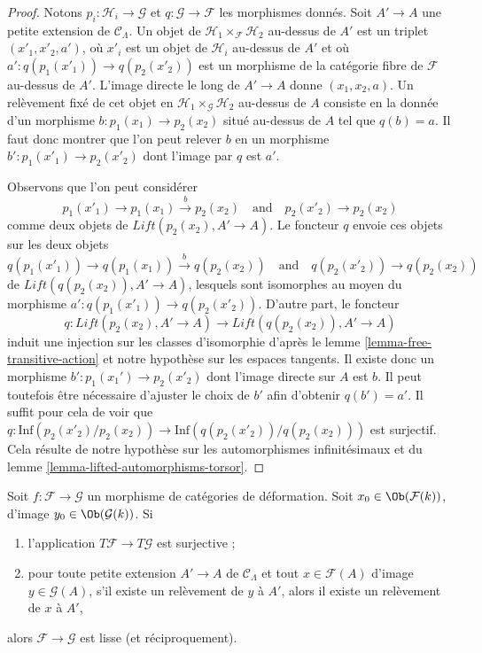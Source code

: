 \begin{proof}
Notons $p_i : \mathcal{H}_i \to \mathcal{G}$ et
$q : \mathcal{G} \to \mathcal{F}$ les morphismes donnés. Soit $A' \to A$ une
petite extension de $\mathcal{C}_\Lambda$. Un objet de
$\mathcal{H}_1 \times_\mathcal{F} \mathcal{H}_2$ au-dessus de $A'$ est un
triplet $(x'_1, x'_2, a')$, où $x'_i$ est un objet de $\mathcal{H}_i$
au-dessus de $A'$ et où $a' : q(p_1(x'_1)) \to q(p_2(x'_2))$ est un morphisme
de la catégorie fibre de $\mathcal{F}$ au-dessus de $A'$. L'image directe le
long de $A' \to A$ donne $(x_1, x_2, a)$. Un relèvement fixé de cet objet en
$\mathcal{H}_1 \times_\mathcal{G} \mathcal{H}_2$ au-dessus de $A$
consiste en la donnée d'un morphisme $b : p_1(x_1) \to p_2(x_2)$ situé au-dessus de $A$ tel que
$q(b) = a$. Il faut donc montrer que l'on peut relever $b$ en un morphisme
$b' : p_1(x'_1) \to p_2(x'_2)$ dont l'image par $q$ est $a'$.

\medskip\noindent
Observons que l'on peut considérer
$$
p_1(x'_1) \to p_1(x_1) \xrightarrow{b} p_2(x_2)
\quad\text{and}\quad
p_2(x'_2) \to p_2(x_2)
$$
comme deux objets de $\textit{Lift}(p_2(x_2), A' \to A)$. Le foncteur $q$
envoie ces objets sur les deux objets
$$
q(p_1(x'_1)) \to q(p_1(x_1)) \xrightarrow{b} q(p_2(x_2))
\quad\text{and}\quad
q(p_2(x'_2)) \to q(p_2(x_2))
$$
de $\textit{Lift}(q(p_2(x_2)), A' \to A)$, lesquels sont isomorphes au moyen
du morphisme $a' : q(p_1(x'_1)) \to q(p_2(x'_2))$. D'autre part, le foncteur
$$
q : \textit{Lift}(p_2(x_2), A' \to A) \to
\textit{Lift}(q(p_2(x_2)), A' \to A)
$$
induit une injection sur les classes d'isomorphie d'après le lemme
\ref{lemma-free-transitive-action} et notre hypothèse sur les espaces tangents.
Il existe donc un morphisme $b' : p_1(x_1') \to p_2(x'_2)$ dont l'image
directe sur $A$ est $b$. Il peut toutefois être nécessaire d'ajuster le choix
de $b'$ afin d'obtenir $q(b') = a'$. Il suffit pour cela de voir que
$q : \text{Inf}(p_2(x'_2)/p_2(x_2)) \to \text{Inf}(q(p_2(x'_2))/q(p_2(x_2)))$
est surjectif. Cela résulte de notre hypothèse sur les automorphismes
infinitésimaux et du lemme \ref{lemma-lifted-automorphisms-torsor}.
\end{proof}

\begin{lemma}
\label{lemma-easy-check-smooth}
Soit $f : \mathcal{F} \to \mathcal{G}$ un morphisme de catégories de
déformation. Soit $x_0 \in \Ob(\mathcal{F}(k))$, d'image
$y_0 \in \Ob(\mathcal{G}(k))$. Si
\begin{enumerate}
\item l'application $T\mathcal{F} \to T\mathcal{G}$ est surjective ;
\item pour toute petite extension $A' \to A$ de $\mathcal{C}_\Lambda$ et tout
$x \in \mathcal{F}(A)$ d'image $y \in \mathcal{G}(A)$, s'il existe un
relèvement de $y$ à $A'$, alors il existe un relèvement de $x$ à $A'$,
\end{enumerate}
alors $\mathcal{F} \to \mathcal{G}$ est lisse (et réciproquement).
\end{lemma}

